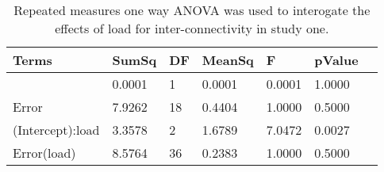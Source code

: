 \begin{table}
\centering
\begin{tabular}[0.2em]{@{}lllllll@{}}\toprule
Terms & SumSq & DF & MeanSq & F & pValue\\\toprule[0.2em]
(Intercept) & 0.0001 & 1 & 0.0001 & 0.0001 & 1.0000 \\\midrule
Error & 7.9262 & 18 & 0.4404 & 1.0000 & 0.5000 \\\midrule
(Intercept):load & 3.3578 & 2 & 1.6789 & 7.0472 & 0.0027 \\\midrule
Error(load) & 8.5764 & 36 & 0.2383 & 1.0000 & 0.5000 \\\bottomrule[0.2em]
\end{tabular}
\caption{Repeated measures one way ANOVA was used to interogate the effects of load for inter-connectivity in study one.\label{tabel:tbl_RMABA1}}
\end{table}
